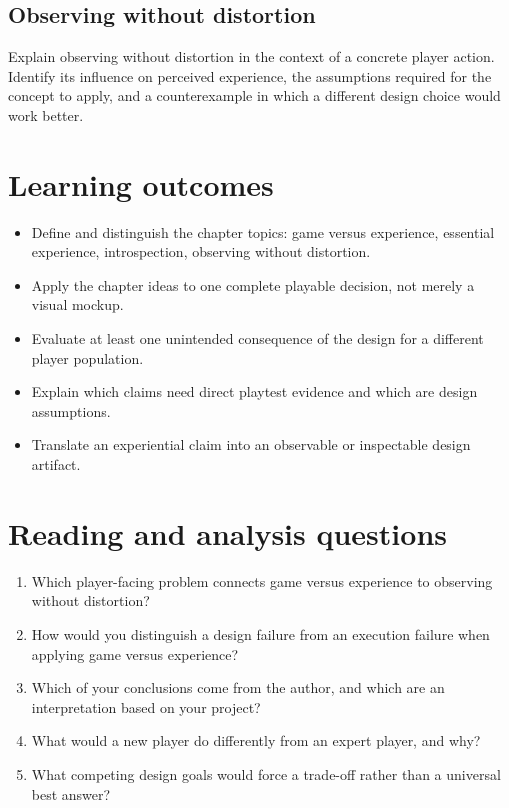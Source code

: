 \documentclass[11pt]{article}
\begin{document}
\subsection{Observing without distortion}
Explain observing without distortion in the context of a concrete player action. Identify its influence on perceived experience, the assumptions required for the concept to apply, and a counterexample in which a different design choice would work better.


\section{Learning outcomes}
\begin{itemize}
\item Define and distinguish the chapter topics: game versus experience, essential experience, introspection, observing without distortion.
\item Apply the chapter ideas to one complete playable decision, not merely a visual mockup.
\item Evaluate at least one unintended consequence of the design for a different player population.
\item Explain which claims need direct playtest evidence and which are design assumptions.
\item Translate an experiential claim into an observable or inspectable design artifact.
\end{itemize}

\section{Reading and analysis questions}
\begin{enumerate}
\item Which player-facing problem connects game versus experience to observing without distortion?
\item How would you distinguish a design failure from an execution failure when applying game versus experience?
\item Which of your conclusions come from the author, and which are an interpretation based on your project?
\item What would a new player do differently from an expert player, and why?
\item What competing design goals would force a trade-off rather than a universal best answer?
\end{enumerate}
\end{document}
